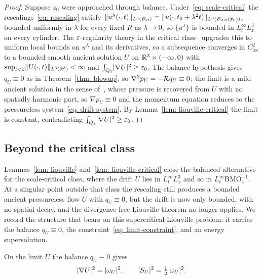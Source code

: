 \begin{proof}
Suppose $z_0$ were approached through balance. Under~\eqref{eq: scale-critical} the
rescalings~\eqref{eq: rescaling} satisfy
$\lVert u^\lambda(\cdot,t) \rVert_{L^3(B_R)}
= \lVert u(\cdot,t_0+\lambda^2 t) \rVert_{L^3(B_{\lambda R}(x_0))}$, bounded uniformly in
$\lambda$ for every fixed $R$ as $\lambda\to0$, so $\{u^\lambda\}$ is bounded in
$L^\infty_t L^3_x$ on every cylinder. The $\varepsilon$-regularity theory in the critical
class~\cite{escauriaza-2003-l3i-nav-equ, seregin-2009-typ-i-sin} upgrades this to
uniform local bounds on $u^\lambda$ and its derivatives, so a subsequence converges
in $C^2_{\mathrm{loc}}$ to a bounded smooth ancient solution $U$ on
$\mathbb{R}^3\times(-\infty,0)$ with $\sup_{t<0}\lVert U(\cdot,t) \rVert_{L^3(\mathbb{R}^3)}<\infty$ and
$\int_{Q_1}\lvert \nabla U \rvert^2 \ge \varepsilon_0$. The balance hypothesis gives $q_U\equiv0$ as
in Theorem~\ref{thm: blowup}, so $\nabla^2 p_U = -\mathcal{R} q_U \equiv 0$; the limit is
a mild ancient solution in the sense of~\cite{koch-2009-lio-the-nav}, whose pressure
is recovered from $U$ with no spatially harmonic part, so $\nabla p_U\equiv0$ and the
momentum equation reduces to the pressureless system~\eqref{eq: drift-system}. By
Lemma~\ref{lem: liouville-critical} the limit is constant, contradicting
$\int_{Q_1}\lvert \nabla U \rvert^2 \ge \varepsilon_0$.
\end{proof}

\subsection{Beyond the critical class}
\label{sec: limit-structure}

Lemmas~\ref{lem: liouville} and~\ref{lem: liouville-critical} close the balanced
alternative for the scale-critical class, where the drift $U$ lies in
$L^\infty_t L^3_x$ and so in $L^\infty_t\mathrm{BMO}^{-1}_x$. At a singular point
outside that class the rescaling still produces a bounded ancient pressureless flow
$U$ with $q_U\equiv0$, but the drift is now only bounded, with no spatial decay, and
the divergence-free Liouville theorem no longer applies. We record the structure that
bears on this supercritical Liouville problem: it carries the balance $q_U\equiv0$,
the constraint~\eqref{eq: limit-constraint}, and an energy supersolution.

\begin{lemma}\label{lem: energy-enstrophy}
On the limit $U$ the balance $q_U\equiv0$ gives
\begin{equation}\label{eq: energy-enstrophy}
  \lvert \nabla U \rvert^2 = \lvert \omega_U \rvert^2,
  \qquad \lvert S_U \rvert^2 = \tfrac12\lvert \omega_U \rvert^2 .
\end{equation}
\end{lemma}

